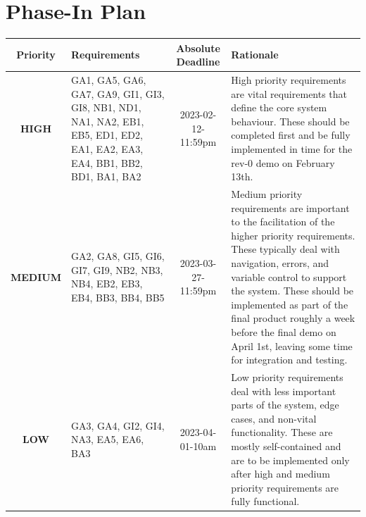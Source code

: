 \documentclass[12pt]{article}
\begin{document}
\section{Phase-In Plan}
\begin{table}[H]
    \centering
    \setlength{\leftmargini}{0.4cm}
    \begin{tabularx}{\linewidth}{|c|X|c|>{\centering\arraybackslash}X|}
        \hline
        Priority & Requirements & Absolute Deadline & Rationale \\
        \hline
        \textbf{HIGH} & GA1, GA5, GA6, GA7, GA9, GI1, GI3, GI8, NB1, ND1, NA1, NA2, EB1, EB5, ED1, ED2, EA1, EA2, EA3, EA4, BB1, BB2, BD1, BA1, BA2 & 2023-02-12-11:59pm & High priority requirements are vital requirements that define the core system behaviour. These should be completed first and be fully implemented in time for the rev-0 demo on February 13th.\\
        \hline
        \textbf{MEDIUM} & GA2, GA8, GI5, GI6, GI7, GI9, NB2, NB3, NB4, EB2, EB3, EB4, BB3, BB4, BB5 & 2023-03-27-11:59pm & Medium priority requirements are important to the facilitation of the higher priority requirements. These typically deal with navigation, errors, and variable control to support the system. These should be implemented as part of the final product roughly a week before the final demo on April 1st, leaving some time for integration and testing.\\
        \hline
        \textbf{LOW} & GA3, GA4, GI2, GI4, NA3, EA5, EA6, BA3 & 2023-04-01-10am & Low priority requirements deal with less important parts of the system, edge cases, and non-vital functionality. These are mostly self-contained and are to be implemented only after high and medium priority requirements are fully functional.\\
        \hline
    \end{tabularx}
    \label{PhaseInTable}
\end{table}
\end{document}
